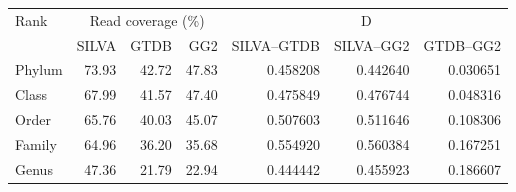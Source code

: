 \begin{tabular}{lrrrrrr}
\hline
Rank & \multicolumn{3}{c}{Read coverage (\%)} & \multicolumn{3}{c}{D} \\
 & SILVA & GTDB & GG2 & SILVA--GTDB & SILVA--GG2 & GTDB--GG2 \\
\hline
Phylum & 73.93 & 42.72 & 47.83 & 0.458208 & 0.442640 & 0.030651 \\
Class & 67.99 & 41.57 & 47.40 & 0.475849 & 0.476744 & 0.048316 \\
Order & 65.76 & 40.03 & 45.07 & 0.507603 & 0.511646 & 0.108306 \\
Family & 64.96 & 36.20 & 35.68 & 0.554920 & 0.560384 & 0.167251 \\
Genus & 47.36 & 21.79 & 22.94 & 0.444442 & 0.455923 & 0.186607 \\
\hline
\end{tabular}
